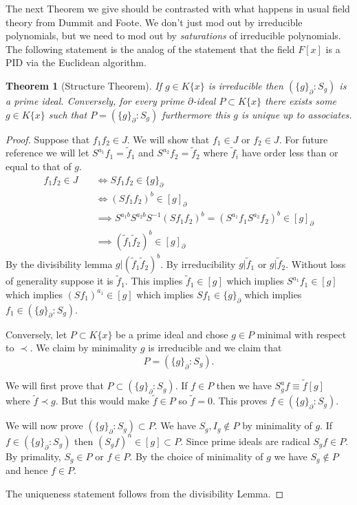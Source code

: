 \documentclass[12pt]{book}
\numberwithin{equation}{section}
\newtheorem{theorem}{Theorem}[subsection]
\theoremstyle{definition}
\theoremstyle{remark}
\begin{document}
The next Theorem we give should be contrasted with what happens in usual field theory from Dummit and Foote. 
We don't just mod out by irreducible polynomials, but we need to mod out by \emph{saturations} of irreducible polynomials. 
The following statement is the analog of the statement that the field $F[x]$ is a PID via the Euclidean algorithm.
\begin{theorem}[Structure Theorem]\label{T:structure-theorem}
If $g \in K\lbrace x \rbrace$ is irreducible then $( \lbrace g \rbrace_{\partial} : S_g)$ is a prime ideal. 
Conversely, for every prime $\partial$-ideal $P \subset K\lbrace x \rbrace$ there exists some $g\in K\lbrace x \rbrace$ such that $P=( \lbrace g \rbrace_{\partial} : S_g)$ furthermore this $g$ is unique up to associates.
\end{theorem}
\begin{proof}
	Suppose that $f_1f_2 \in J$.
	We will show that $f_1 \in J$ or $f_2 \in J$.
	For future reference we will let $S^{a_1}f_1 = \widetilde{f}_1$ and $S^{a_2}f_2 = \widetilde{f}_2$ where $\widetilde{f}_i$ have order less than or equal to that of $g$.
	\begin{align*} 
	f_1f_2 \in J \quad &\iff  S f_1f_2 \in \lbrace g \rbrace_{\partial} \\
	&\iff (Sf_1f_2)^b \in [g]_{\partial}\\
	&\implies S^{a_1b}S^{a_2b}S^{-1} (S f_1f_2)^b  = (S^{a_1}f_1 S^{a_2} f_2)^b \in [g]_{\partial} \\
	&\implies (\widetilde{f}_1\widetilde{f}_2)^b \in [g]_{\partial} 
	\end{align*}
	By the divisibility lemma $g \vert (\widetilde{f}_1\widetilde{f}_2)^b$. 
	By irreducibility $g \vert \widetilde{f}_1$ or $g\vert \widetilde{f}_2$. 
	Without loss of generality suppose it is $\widetilde{f}_1$.
	This implies $\widetilde{f}_1 \in [g]$ which implies $S^{a_1}f_1 \in [g]$ which implies $(Sf_1)^{a_1} \in [g]$ which implies $Sf_1 \in \lbrace g \rbrace_{\partial}$ which implies $f_1 \in (\lbrace g\rbrace_{\partial}:S_g)$. 
	
	Conversely, let $P \subset K\lbrace x \rbrace$ be a prime ideal and chose $g\in P$ minimal with respect to $\prec$. 
	We claim by minimality $g$ is irreducible and we claim that 
	 $$ P = ( \lbrace g \rbrace_{\partial} \colon S_g ).$$
	
	We will first prove that $P \subset (\lbrace g\rbrace_{\partial}\colon S_g)$.
	If $f \in P$ then we have $S_g^a f \equiv \widetilde{f} [g]$ where $\widetilde{f}\prec g$. 
	But this would make $\widetilde{f}\in P$ so $\widetilde{f}=0$. 
	This proves $f\in (\lbrace g\rbrace_{\partial}\colon S_g)$.
	
	We will now prove $(\lbrace g\rbrace_{\partial}\colon S_g)\subset P$.
	We have $S_g,I_g\notin P$ by minimality of $g$. 
	If $f \in (\lbrace g\rbrace_{\partial}\colon S_g)$ then $(S_g f)^n \in [g] \subset P$.
	Since prime ideals are radical $S_g f \in P$. 
	By primality, $S_g\in P$ or $f\in P$. 
	By the choice of minimality of $g$ we have $S_g\notin P$ and hence $f\in P$. 
	
	The uniqueness statement follows from the divisibility Lemma.
\end{proof}
\end{document}
